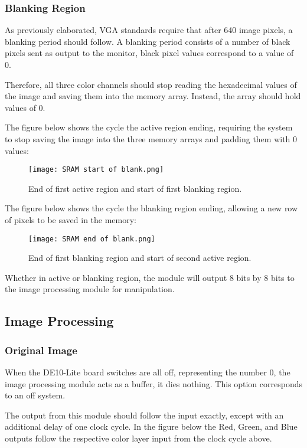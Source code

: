\subsubsection{Blanking Region}
\par As previously elaborated, VGA standards require that after 640 image pixels, a blanking period should follow. A blanking period consists of a number of black pixels sent as output to the monitor, black pixel values correspond to a value of 0. \newline
\par Therefore, all three color channels should stop reading the hexadecimal values of the image and saving them into the memory array. Instead, the array should hold values of 0. \newline
\par The figure below shows the cycle the active region ending, requiring the system to stop saving the image into the three memory arrays and padding them with 0 values: \newline

\begin{figure}[H]
	\centering
	\texttt{[image: SRAM start of blank.png]}
	\caption{End of first active region and start of first blanking region.}
	\label{fig:sramendactive}  
\end{figure} 

\par The figure below shows the cycle the blanking region ending, allowing a new row of pixels to be saved in the memory: \newline

\begin{figure}[H]
	\centering
	\texttt{[image: SRAM end of blank.png]}
	\caption{End of first blanking region and start of second active region.}
	\label{fig:sramendblank}  
\end{figure} 

\par Whether in active or blanking region, the module will output 8 bits by 8 bits to the image processing module for manipulation. \newline

\subsection{Image Processing}
\subsubsection{Original Image}
\par When the DE10-Lite board switches are all off, representing the number 0, the image processing module acts as a buffer, it dies nothing. This option corresponds to an off system. \newline
\par The output from this module should follow the input exactly, except with an additional delay of one clock cycle. In the figure below the Red, Green, and Blue outputs follow the respective color layer input from the clock cycle above. \newline

